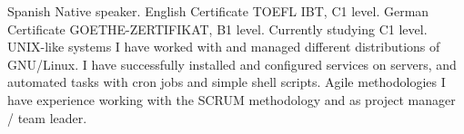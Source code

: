 \begin{cvskills}
    \cvskill
        {Spanish}
        {Native speaker.}
    \cvskill
        {English}
        {Certificate TOEFL IBT, C1 level.}
    \cvskill
        {German}
        {Certificate GOETHE-ZERTIFIKAT, B1 level. Currently studying C1 level.}
    \cvskill
        {UNIX-like systems}
        {I have worked with and managed different distributions of GNU/Linux. I have successfully installed and configured services on servers, and automated tasks with cron jobs and simple shell scripts.}
    \cvskill
        {Agile methodologies}
        {I have experience working with the SCRUM methodology and as project manager / team leader.}
\end{cvskills}
